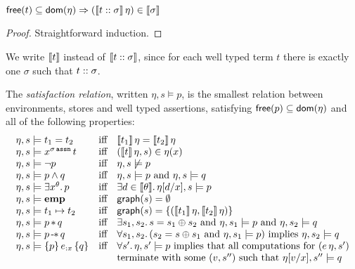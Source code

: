 \documentclass[12pt,a4paper]{article}
\newcommand{\emp}{\ensuremath{\mathbf{emp}}}
\begin{document}
\begin{lemma}
  $\mathsf{free}(t) \subseteq \mathsf{dom}(\eta) \Rightarrow (\llbracket{t}\mathrel{::}{\sigma}\rrbracket\,\eta)\in\llbracket\sigma\rrbracket$
\end{lemma}

\begin{proof}
  Straightforward induction.
\end{proof}

We write $\llbracket t\rrbracket$ instead of $\llbracket{t}\mathrel{::}{\sigma}\rrbracket$, since for each well typed term $t$ there is
exactly one $\sigma$ such that ${t}\mathrel{::}{\sigma}$.

\begin{definition}
  The {\em satisfaction relation}, written $\eta,s \models p$, is the smallest relation between 
  environments, stores and well typed assertions, satisfying $\mathsf{free}(p) \subseteq \mathsf{dom}(\eta)$ and all of the
  following properties:
  \[\begin{array}{lcl}
    \eta,s \models t_1 = t_2
    &\text{iff}& \semantic{t_1}\,\eta = \semantic{t_2}\,\eta \\
    \eta,s \models \app{x^{\tassn[\sigma]}}{t}
    &\text{iff}& (\semantic{t}\,\eta,s) \in \eta(x) \\
    \eta,s \models \neg p
    &\text{iff}& \eta,s \not\models p \\
    \eta,s \models p \wedge q
    &\text{iff}& \eta,s \models p \text{ and } \eta,s \models q \\
    \eta,s \models \exists x^\theta.\,p
    &\text{iff}& \exists d \in \semantic{\theta}.\,\eta[d/x],s \models p \\
    \eta,s \models \emp
    &\text{iff}& \grph{s} = \emptyset \\
    \eta,s \models t_1 \mapsto t_2
    &\text{iff}& \grph{s} = \{(\semantic{t_1}\,\eta,\semantic{t_2}\,\eta)\} \\
    \eta,s \models p \sepcon q
    &\text{iff}& \exists s_1,s_2.\,s=s_1 \oplus s_2 \text{ and } \eta,s_1 \models p \text{ and } \eta,s_2 \models q \\
    \eta,s \models p \sepimp q
    &\text{iff}& \forall s_1,s_2.\,(s_2 = s \oplus s_1 \text{ and } \eta,s_1 \models p) \text{ implies } \eta,s_2 \models q \\
    \eta,s \models \triplex{p}{e}{x}{q}
    &\text{iff}& \forall s'.\,\eta,s' \models p \text{ implies that all computations for } (e\,\eta,s') \\
    && \text{terminate with some $(v,s'')$ such that } \eta[v/x],s'' \models q
  \end{array}\]
\end{definition}
\end{document}
